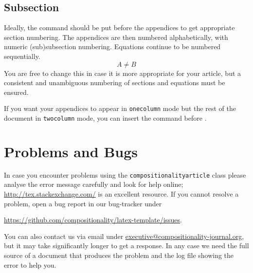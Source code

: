 \documentclass[
    accepted=2020-05-01,
    published=true,
    issue=1, 
    volume=2, 
    a4paper,
]{compositionalityarticle}
\begin{document}
\subsection{Subsection}
Ideally, the command \texttt{\string\appendix} should be put before the appendices to get appropriate section numbering.
The appendices are then numbered alphabetically, with numeric (sub)subsection numbering.
Equations continue to be numbered sequentially.
\begin{equation}
  A \neq B
\end{equation}
You are free to change this in case it is more appropriate for your article, but a consistent and unambiguous numbering of sections and equations must be ensured.

If you want your appendices to appear in \texttt{onecolumn} mode but the rest of the document in \texttt{twocolumn} mode, you can insert the command \texttt{\string\onecolumn\string\newpage} before \texttt{\string\appendix}.   

\section{Problems and Bugs}
In case you encounter problems using the \texttt{compositionalityarticle} class please analyse the error message carefully and look for help online; \href{http://tex.stackexchange.com/}{http://tex.stackexchange.com/} is an excellent resource.
If you cannot resolve a problem,  open a bug report in our bug-tracker under 
\begin{center}
  \href{https://github.com/compositionality/issues}{https://github.com/compositionality/latex-template/issues}.
\end{center}

You can also contact us via email under \href{executive-board@compositionality-journal.org}{executive@compositionality-journal.org}, but it may take significantly longer to get a response.
In any case we need the full source of a document that produces the problem and the log file showing the error to help you.
\end{document}
